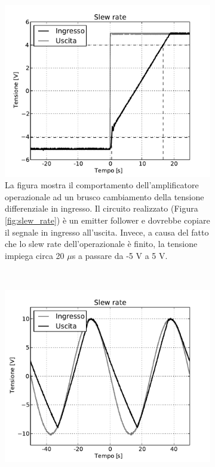 \begin{figure}[H]
        \centering
        \begin{subfigure}[]{0.45\textwidth}
        	\includegraphics[scale=0.55]{Figure/slew_graph1.pdf}
            \caption{La figura mostra il comportamento dell'amplificatore operazionale ad un brusco cambiamento della tensione differenziale in ingresso. Il circuito realizzato (Figura \ref{fig:slew_rate}) è un emitter follower e dovrebbe copiare il segnale in ingresso all'uscita. Invece, a causa del fatto che lo slew rate dell'operazionale è finito, la tensione impiega circa 20 $\mu$s a passare da -5 V a 5 V.}
                \label{fig:slew_rate_plot1}
        \end{subfigure}
        ~
        \begin{subfigure}[]{0.45\textwidth}
        	\includegraphics[scale=0.55]{Figure/slew_signal3.pdf}

\end{subfigure}
\end{figure}

